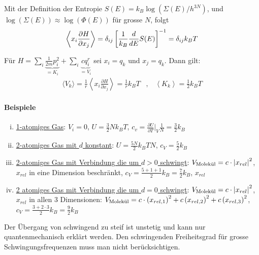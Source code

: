\begin{korollar}
    Mit der Definition der Entropie $S(E) = k_B \log(\Sigma(E)/h^{3N})$,
    und $\log(\Sigma(E)) \approx \log(\Phi(E))$ für grosse $N$, folgt
    \begin{align*}
        \left\langle x_i \frac{\partial H}{\partial x_j} \right\rangle
        = \delta_{ij} \left[ \frac{1}{k_B} \frac{d}{dE} S(E) \right]^{-1}
        = \delta_{ij} k_B T
    \end{align*}
\end{korollar}

\begin{bemerkung}[Anwendung]
    Für $H = \sum_i \underbrace{\frac{1}{2 m} p_i^2}_{= K_i} + \sum_i \underbrace{c q_i^r}_{= V_i}$
    sei $x_i = q_k$ und $x_j = q_k$. Dann gilt:
    \begin{align*}
        \langle V_k \rangle = \frac{1}{r} \left\langle x_i \frac{\partial H}{\partial x_j} \right\rangle
        = \frac{1}{r} k_B T
        \hspace{10pt} , \hspace{10pt}
        \left\langle K_k \right\rangle = \frac{1}{2} k_B T
    \end{align*}
\end{bemerkung}

\paragraph{Beispiele}

\begin{enumerate}[(i)]
    \item \underline{1-atomiges Gas}: $V_i = 0$, $U = \frac{3}{2} N k_B T$,
        $c_v = \frac{\partial U}{\partial T} \Big|_V \frac{1}{N} = \frac{3}{2} k_B$
    \item \underline{2-atomiges Gas mit $d$ konstant}: $U = \frac{5 N}{2} k_B T N$,
        $c_V = \frac{5}{2} k_B$
    \item \underline{2-atomiges Gas mit Verbindung die um $d>0$ schwingt}:
        $V_{\text{Molekül}} = c \cdot \left\vert x_{rel} \right\vert^2$,
        $x_{rel}$ in eine Dimension beschränkt,
        $c_V = \frac{5+1+1}{2} k_B = \frac{7}{2} k_B$, $x_{rel}$
    \item \underline{2 atomiges Gas mit Verbindung die um $d=0$ schwingt}:
        $V_{\text{Molekül}} = c \cdot \left\vert x_{rel} \right\vert^2$,
        $x_{rel}$ in allen 3 Dimensionen:
        $V_{\text{Molekül}} = c \cdot \left( x_{rel,1} \right)^2 + c \left( x_{rel,2} \right)^2
        + c \left( x_{rel,3} \right)^2$,
        $c_V = \frac{3+2 \cdot 3}{2} k_B = \frac{9}{2} k_B$
\end{enumerate}
Der Übergang von schwingend zu steif ist unstetig und kann nur quantenmechanisch
erklärt werden. Den schwingenden Freiheitsgrad für grosse Schwingungsfrequenzen
muss man nicht berücksichtigen.


